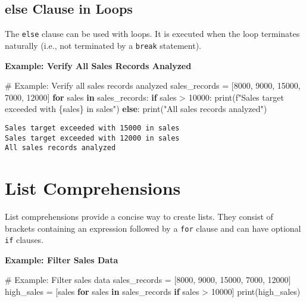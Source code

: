 \documentclass[
  letterpaper,
  DIV=11,
  numbers=noendperiod]{scrreprt}
\newenvironment{Shaded}{\begin{snugshade}}{\end{snugshade}}
\newcommand{\BuiltInTok}[1]{\textcolor[rgb]{0.00,0.23,0.31}{#1}}
\newcommand{\CommentTok}[1]{\textcolor[rgb]{0.37,0.37,0.37}{#1}}
\newcommand{\ControlFlowTok}[1]{\textcolor[rgb]{0.00,0.23,0.31}{\textbf{#1}}}
\newcommand{\DecValTok}[1]{\textcolor[rgb]{0.68,0.00,0.00}{#1}}
\newcommand{\KeywordTok}[1]{\textcolor[rgb]{0.00,0.23,0.31}{\textbf{#1}}}
\newcommand{\NormalTok}[1]{\textcolor[rgb]{0.00,0.23,0.31}{#1}}
\newcommand{\OperatorTok}[1]{\textcolor[rgb]{0.37,0.37,0.37}{#1}}
\newcommand{\SpecialCharTok}[1]{\textcolor[rgb]{0.37,0.37,0.37}{#1}}
\newcommand{\SpecialStringTok}[1]{\textcolor[rgb]{0.13,0.47,0.30}{#1}}
\newcommand{\StringTok}[1]{\textcolor[rgb]{0.13,0.47,0.30}{#1}}
\begin{document}
\subsection{else Clause in Loops}\label{else-clause-in-loops}

The \texttt{else} clause can be used with loops. It is executed when the
loop terminates naturally (i.e., not terminated by a \texttt{break}
statement).

\textbf{Example: Verify All Sales Records Analyzed}

\begin{Shaded}
\begin{Highlighting}[]
\CommentTok{\# Example: Verify all sales records analyzed}
\NormalTok{sales\_records }\OperatorTok{=}\NormalTok{ [}\DecValTok{8000}\NormalTok{, }\DecValTok{9000}\NormalTok{, }\DecValTok{15000}\NormalTok{, }\DecValTok{7000}\NormalTok{, }\DecValTok{12000}\NormalTok{]}
\ControlFlowTok{for}\NormalTok{ sales }\KeywordTok{in}\NormalTok{ sales\_records:}
    \ControlFlowTok{if}\NormalTok{ sales }\OperatorTok{\textgreater{}} \DecValTok{10000}\NormalTok{:}
        \BuiltInTok{print}\NormalTok{(}\SpecialStringTok{f"Sales target exceeded with }\SpecialCharTok{\{}\NormalTok{sales}\SpecialCharTok{\}}\SpecialStringTok{ in sales"}\NormalTok{)}
\ControlFlowTok{else}\NormalTok{:}
    \BuiltInTok{print}\NormalTok{(}\StringTok{"All sales records analyzed"}\NormalTok{)}
\end{Highlighting}
\end{Shaded}

\begin{verbatim}
Sales target exceeded with 15000 in sales
Sales target exceeded with 12000 in sales
All sales records analyzed
\end{verbatim}

\section{List Comprehensions}\label{list-comprehensions}

List comprehensions provide a concise way to create lists. They consist
of brackets containing an expression followed by a \texttt{for} clause
and can have optional \texttt{if} clauses.

\textbf{Example: Filter Sales Data}

\begin{Shaded}
\begin{Highlighting}[]
\CommentTok{\# Example: Filter sales data}
\NormalTok{sales\_records }\OperatorTok{=}\NormalTok{ [}\DecValTok{8000}\NormalTok{, }\DecValTok{9000}\NormalTok{, }\DecValTok{15000}\NormalTok{, }\DecValTok{7000}\NormalTok{, }\DecValTok{12000}\NormalTok{]}
\NormalTok{high\_sales }\OperatorTok{=}\NormalTok{ [sales }\ControlFlowTok{for}\NormalTok{ sales }\KeywordTok{in}\NormalTok{ sales\_records }\ControlFlowTok{if}\NormalTok{ sales }\OperatorTok{\textgreater{}} \DecValTok{10000}\NormalTok{]}
\BuiltInTok{print}\NormalTok{(high\_sales)}
\end{Highlighting}
\end{Shaded}
\end{document}
